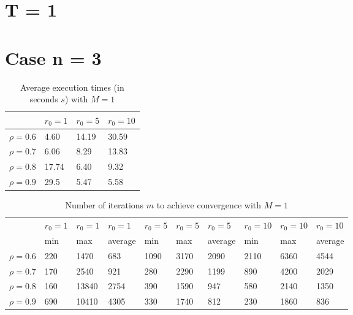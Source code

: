 \documentclass[a4paper,11pt,openright]{report}
\begin{document}
\section{T = 1}
\section*{Case n = 3} 
\begin{table}[H]
\centering
\addtolength{\leftskip}{-1.5cm}
\addtolength{\rightskip}{-1.5cm}
\begin{tabular}{|c|lll|}
\hline
$ $ & $r_0 = 1$ & $r_0 = 5$ & $r_0 = 10$ \\
\hline
$\rho = 0.6$ & 4.60 & 14.19 & 30.59 \\

$\rho = 0.7$ & 6.06 & 8.29 & 13.83 \\

$\rho = 0.8$ & 17.74 & 6.40 & 9.32 \\

$\rho = 0.9$ & 29.5 & 5.47 & 5.58 \\
\hline
\end{tabular}
\caption{Average execution
 times (in seconds $s$) with $M = 1$}
\end{table}
\begin{table}[H]
\centering
\addtolength{\leftskip}{-1.5cm}
\addtolength{\rightskip}{-1.5cm}
\begin{tabular}{|c|lllllllll|}
\hline
$ $ & $r_0 = 1$ & $r_0 = 1$ & $r_0 = 1$ & $r_0 = 5$ & $r_0 = 5$ & $r_0 = 5$ & $r_0 = 10$ & $r_0 = 10$ & $r_0 = 10$  \\
$ $ & min & max & average & min & max & average & min & max & average \\ 
\hline
$\rho = 0.6$ & 220 & 1470 & 683 & 1090 & 3170 & 2090 & 2110 & 6360 & 4544 \\

$\rho = 0.7$ & 170 & 2540 & 921 & 280 & 2290 & 1199 & 890 & 4200 & 2029\\

$\rho = 0.8$ & 160 & 13840 & 2754 & 390 & 1590 & 947 & 580 & 2140 & 1350\\

$\rho = 0.9$ & 690 & 10410 & 4305 & 330 & 1740 & 812 & 230 & 1860 & 836\\
\hline
\end{tabular}
\caption{Number of iterations $m$ to achieve convergence with $M = 1$}
\end{table}
\end{document}
